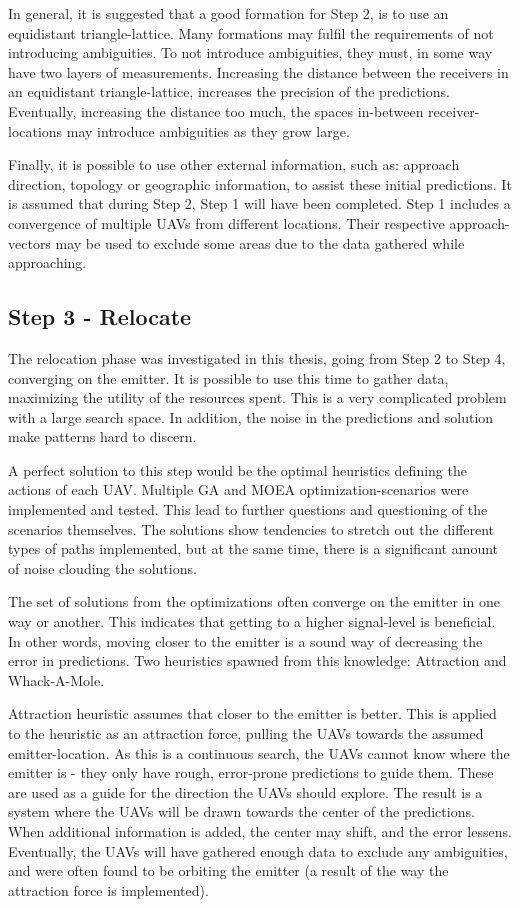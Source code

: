\documentclass[10pt,a4paper]{book}
\begin{document}
In general, it is suggested that a good formation for Step 2, is to use an equidistant triangle-lattice. Many formations may fulfil the requirements of not introducing ambiguities. To not introduce ambiguities, they must, in some way have two layers of measurements. Increasing the distance between the receivers in an equidistant triangle-lattice, increases the precision of the predictions. Eventually, increasing the distance too much, the spaces in-between receiver-locations may introduce ambiguities as they grow large.

Finally, it is possible to use other external information, such as: approach direction, topology or geographic information, to assist these initial predictions. It is assumed that during Step 2, Step 1 will have been completed. Step 1 includes a convergence of multiple \glspl{UAV} from different locations. Their respective approach-vectors may be used to exclude some areas due to the data gathered while approaching.

\newpage

\subsection{Step 3 - Relocate}

The relocation phase was investigated in this thesis, going from Step 2 to Step 4, converging on the emitter. It is possible to use this time to gather data, maximizing the utility of the resources spent. This is a very complicated problem with a large search space. In addition, the noise in the predictions and solution make patterns hard to discern.

A perfect solution to this step would be the optimal heuristics defining the actions of each \gls{UAV}. Multiple \gls{GA} and \gls{MOEA} optimization-scenarios were implemented and tested. This lead to further questions and questioning of the scenarios themselves. The solutions show tendencies to stretch out the different types of paths implemented, but at the same time, there is a significant amount of noise clouding the solutions. 

The set of solutions from the optimizations often converge on the emitter in one way or another. This indicates that getting to a higher signal-level is beneficial. In other words, moving closer to the emitter is a sound way of decreasing the error in predictions. Two heuristics spawned from this knowledge: Attraction and Whack-A-Mole.

Attraction heuristic assumes that closer to the emitter is better. This is applied to the heuristic as an attraction force, pulling the \glspl{UAV} towards the assumed emitter-location. As this is a continuous search, the \glspl{UAV} cannot know where the emitter is - they only have rough, error-prone predictions to guide them. These are used as a guide for the direction the \glspl{UAV} should explore. The result is a system where the \glspl{UAV} will be drawn towards the center of the predictions. When additional information is added, the center may shift, and the error lessens. Eventually, the \glspl{UAV} will have gathered enough data to exclude any ambiguities, and were often found to be orbiting the emitter (a result of the way the attraction force is implemented).
\end{document}
